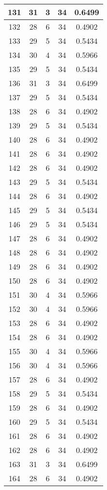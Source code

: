 \documentclass[letterpaper, 12pt]{article}
\begin{document}
\begin{longtable}{|c|c|c|c|c|}
\hline
131 & 31 & 3 & 34 & 0.6499 \\
\hline
132 & 28 & 6 & 34 & 0.4902 \\
\hline
133 & 29 & 5 & 34 & 0.5434 \\
\hline
134 & 30 & 4 & 34 & 0.5966 \\
\hline
135 & 29 & 5 & 34 & 0.5434 \\
\hline
136 & 31 & 3 & 34 & 0.6499 \\
\hline
137 & 29 & 5 & 34 & 0.5434 \\
\hline
138 & 28 & 6 & 34 & 0.4902 \\
\hline
139 & 29 & 5 & 34 & 0.5434 \\
\hline
140 & 28 & 6 & 34 & 0.4902 \\
\hline
141 & 28 & 6 & 34 & 0.4902 \\
\hline
142 & 28 & 6 & 34 & 0.4902 \\
\hline
143 & 29 & 5 & 34 & 0.5434 \\
\hline
144 & 28 & 6 & 34 & 0.4902 \\
\hline
145 & 29 & 5 & 34 & 0.5434 \\
\hline
146 & 29 & 5 & 34 & 0.5434 \\
\hline
147 & 28 & 6 & 34 & 0.4902 \\
\hline
148 & 28 & 6 & 34 & 0.4902 \\
\hline
149 & 28 & 6 & 34 & 0.4902 \\
\hline
150 & 28 & 6 & 34 & 0.4902 \\
\hline
151 & 30 & 4 & 34 & 0.5966 \\
\hline
152 & 30 & 4 & 34 & 0.5966 \\
\hline
153 & 28 & 6 & 34 & 0.4902 \\
\hline
154 & 28 & 6 & 34 & 0.4902 \\
\hline
155 & 30 & 4 & 34 & 0.5966 \\
\hline
156 & 30 & 4 & 34 & 0.5966 \\
\hline
157 & 28 & 6 & 34 & 0.4902 \\
\hline
158 & 29 & 5 & 34 & 0.5434 \\
\hline
159 & 28 & 6 & 34 & 0.4902 \\
\hline
160 & 29 & 5 & 34 & 0.5434 \\
\hline
161 & 28 & 6 & 34 & 0.4902 \\
\hline
162 & 28 & 6 & 34 & 0.4902 \\
\hline
163 & 31 & 3 & 34 & 0.6499 \\
\hline
164 & 28 & 6 & 34 & 0.4902 \\

\end{longtable}
\end{document}
